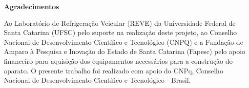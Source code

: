 \onehalfspacing
\newpage
\begin{center}
    \textbf{Agradecimentos}
\end{center}

{

Ao Laboratório de Refrigeração Veicular (REVE) da Universidade Federal de Santa Catarina (UFSC) pelo suporte na realização deste projeto, ao Conselho Nacional de Desenvolvimento Científico e Tecnológico (CNPQ) e a Fundação de Amparo à Pesquisa e Inovação do Estado de Santa Catarina (Fapesc) pelo apoio financeiro para aquisição dos equipamentos necessários para a construção do aparato.
O presente trabalho foi realizado com apoio do CNPq, Conselho Nacional de Desenvolvimento Científico e Tecnológico - Brasil.
}